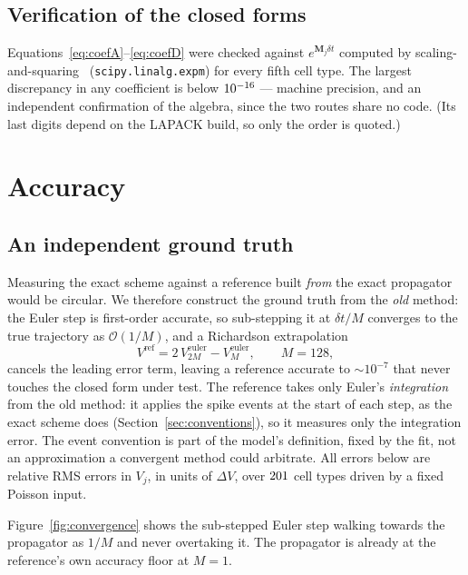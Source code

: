\documentclass[11pt,a4paper,numbers=noenddot]{scrartcl}
\newcommand{\dt}{\delta t}
\newcommand{\code}[1]{\texttt{\small #1}}
\begin{document}
\subsection{Verification of the closed forms}

Equations~\eqref{eq:coefA}--\eqref{eq:coefD} were checked against
$e^{\bm{M}_j\dt}$ computed by scaling-and-squaring~\cite{higham2005scaling}
(\code{scipy.linalg.expm}) for every fifth cell type. The largest discrepancy
in any coefficient is below $10^{-16}$ --- machine precision, and an
independent confirmation of the algebra, since the two routes share no code.
(Its last digits depend on the LAPACK build, so only the order is quoted.)

\section{Accuracy}
\label{sec:accuracy}

\subsection{An independent ground truth}

Measuring the exact scheme against a reference built \emph{from} the exact
propagator would be circular. We therefore construct the ground truth from the
\emph{old} method: the Euler step is first-order accurate, so
sub-stepping it at $\dt/M$ converges to the true trajectory as
$\mathcal{O}(1/M)$, and a Richardson extrapolation~\cite{richardson1911approximate}
%
\begin{equation}
\label{eq:richardson}
V^{\mathrm{ref}} = 2\,V^{\mathrm{euler}}_{2M} - V^{\mathrm{euler}}_{M},
\qquad M = 128,
\end{equation}
%
cancels the leading error term, leaving a reference accurate to
$\sim\!10^{-7}$ that never touches the closed form under test. The reference
takes only Euler's \emph{integration} from the old method: it applies the
spike events at the start of each step, as the exact scheme does
(Section~\ref{sec:conventions}), so it measures only the integration error.
The event convention is part of the model's definition, fixed by the fit,
not an approximation a convergent method could arbitrate. All errors
below are relative RMS errors in $V_j$, in units of $\Delta V$, over
$201$ cell types driven by a fixed Poisson input.

Figure~\ref{fig:convergence} shows the sub-stepped Euler step walking towards the
propagator as $1/M$ and never overtaking it. The propagator is already at the
reference's own accuracy floor at $M = 1$.
\end{document}
